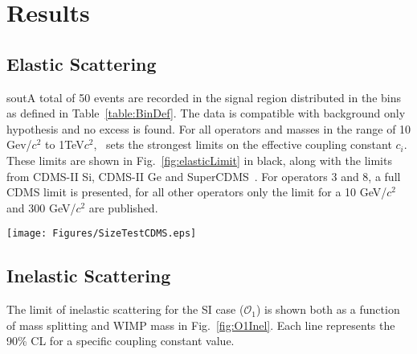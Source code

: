 \section{Results}
\subsection{Elastic Scattering}
sout{A total of 50 events are recorded in the signal region distributed in the bins as defined in Table~\ref{table:BinDef}.} The data is compatible with background only hypothesis and no excess is found. For all operators and masses in the range of 10 Gev/$c^2$ to 1TeV$c^2$, \Xehund\ sets the strongest limits on the effective coupling constant $c_i$. These limits are shown in Fig.~\ref{fig:elasticLimit} in black, along with the limits from CDMS-II Si, CDMS-II Ge and SuperCDMS~\cite{CDMSEFT}. For operators 3 and 8, a full CDMS limit is presented, for all other operators only the limit for a 10 GeV/$c^2$ and 300 GeV/$c^2$ are published.  

\begin{figure*}
\begin{minipage}{1.\linewidth}{}
\centerline{\texttt{[image: Figures/SizeTestCDMS.eps]}}
\end{minipage}
\caption{The \Xehund\ limits (90\% CL) Limits on isoscalar dimensionless coupling for all elastic scattering EFT operators are indicated in solid black. The expected sensitivity obtained assuming background only are is shown in green and yellow(1$\sigma$ and 2$\sigma$ respectively). Limits from CDMS-II Si CDMS-II Ge and SuperCDMS cite{CDMS} are presented in blue Astrix ,green triangle and orange rectangle (color online). For operator 3 and 8 a full limit from CDMS is published and indicated by a dashed line in the respected colors.}
\label{fig:elasticLimit}
\end{figure*}


\subsection{Inelastic Scattering}
The limit of inelastic scattering for the SI case ($\mathcal{O}_1$) is shown both as a function of mass splitting and WIMP mass in Fig.~\ref{fig:O1Inel}. Each line represents the 90\% CL for a specific coupling constant value. 

